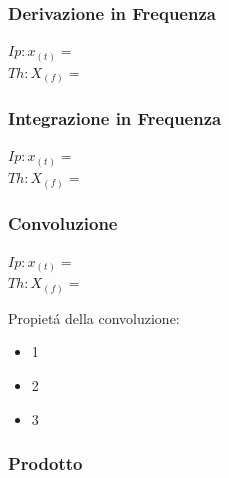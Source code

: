         \subsubsection{Derivazione in Frequenza}\label{Derivazione in Frequenza}
            $Ip: x_{(t)} = $\\        
            $Th: X_{(f)} = $ 
            
        \subsubsection{Integrazione in Frequenza}\label{Integrazione in Frequenza}
            $Ip: x_{(t)} = $\\        
            $Th: X_{(f)} = $ 
        
        \subsubsection{Convoluzione}\label{Convoluzione}
            $Ip: x_{(t)} = $\\        
            $Th: X_{(f)} = $ 
            
            Propietá della convoluzione:
            \begin{itemize}
                \item {1}
                \item {2}
                \item {3}
            \end{itemize}
        \subsubsection{Prodotto}\label{Prodotto}


